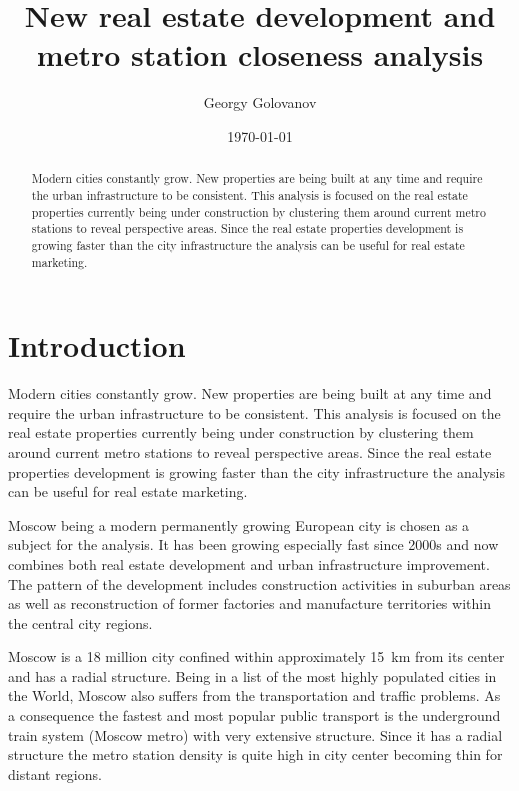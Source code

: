 \documentclass{cernatlasnote}
\title{New real estate development and metro station closeness analysis}
\author{Georgy Golovanov}
\date{\today}
\begin{document}
\maketitle

\begin{abstract}
Modern cities constantly grow. 
New properties are being built at any time and require the urban infrastructure to be consistent.
This analysis is focused on the real estate properties currently being under construction
by clustering them around current 
metro stations to reveal perspective areas.
Since the real estate properties development is growing faster than the city infrastructure
the analysis can be useful for real estate marketing.
\end{abstract}

\vfill
\clearpage

\begingroup
\color{black}
\tableofcontents
\endgroup
\pagebreak


\section{Introduction}
\label{into}
Modern cities constantly grow. 
New properties are being built at any time and require the urban infrastructure to be consistent.
This analysis is focused on the real estate properties currently being under construction
by clustering them around current 
metro stations to reveal perspective areas.
Since the real estate properties development is growing faster than the city infrastructure
the analysis can be useful for real estate marketing.

Moscow being a modern permanently growing European city is chosen as a subject for the analysis.
It has been growing especially fast since 2000s and now combines both real estate development 
and urban infrastructure improvement.
The pattern of the development includes construction activities in suburban areas
as well as reconstruction of former factories and manufacture territories within the central city regions.

Moscow is a 18 million city confined within approximately 15~km from its center and has a radial structure.
Being in a list of the most highly populated cities in the World, Moscow also suffers from the
transportation and traffic problems.
As a consequence the fastest and most popular public transport is the underground train system (Moscow metro)
with very extensive structure.
Since it has a radial structure the metro station density is quite high in city center becoming thin for distant regions.
\end{document}
